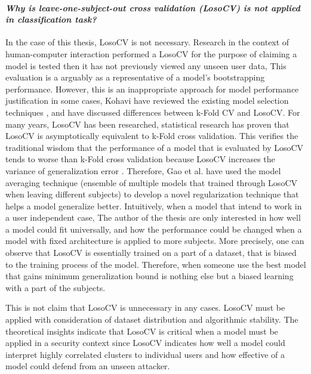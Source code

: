 \paragraph{\emph{Why is leave-one-subject-out cross validation (LosoCV) is not applied in classification task?}}

In the case of this thesis, LosoCV is not necessary. Research in the context of human-computer interaction 
performed a LosoCV for the purpose of claiming a model is tested then it has not previously viewed 
any unseen user data,
This evaluation is a arguably as a representative of a model's bootstrapping performance.
However, this is an inappropriate approach for model performance justification in some cases,
Kohavi have reviewed the existing model selection techniques \cite{kohavi1995study}, and have
discussed differences between k-Fold CV and LosoCV.
For many years, LosoCV has been researched, statistical research \cite{xu2012asymptotic} has proven
that LosoCV is asymptotically equivalent to k-Fold cross validation. This verifies 
the traditional wisdom that the performance of 
a model that is evaluated by LosoCV tends to worse than k-Fold cross validation because
LosoCV increases the variance of generalization error \cite{bengio2004no}. Therefore, Gao et al. have used 
the model averaging technique (ensemble of multiple models that trained through LosoCV when 
leaving different subjects) to develop a novel regularization technique \cite{gao2016139} 
that helps a model generalize better.
Intuitively, when a model that intend to work in a user independent case, 
The author of the thesis are only interested in how well a model could fit universally, 
and how the performance could be changed when a model with fixed architecture is applied to more subjects.
More precisely, one can observe that LosoCV is essentially trained on a part of a dataset, 
that is biased to the training process of the model. Therefore, when someone use 
the best model that gains minimum generalization bound is nothing else but a biased learning 
with a part of the subjects.

This is not claim that LosoCV is unnecessary in any cases. LosoCV must be applied with consideration
of dataset distribution and algorithmic stability.
The theoretical insights indicate
that LosoCV is critical when a model must be applied in a security context since 
LosoCV indicates how well a model could interpret highly correlated clusters 
to individual users and how effective of a model could defend from an unseen attacker.

